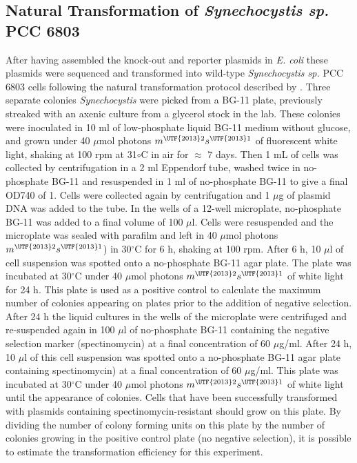 \subsection{Natural Transformation of \textit{Synechocystis sp.} PCC 6803}
\label{sec:transf}
After having assembled the knock-out and reporter plasmids in \textit{E. coli} these plasmids were sequenced and transformed into wild-type \textit{Synechocystis sp.} PCC 6803 cells following the natural transformation protocol described by \cite{Pope2020}.
Three separate colonies \textit{Synechocystis} were picked from a BG-11 plate, previously streaked with an axenic culture from a glycerol stock in the lab. These colonies were inoculated in 10 ml of low-phosphate liquid BG-11 medium without glucose, and grown under 40 $\mu$mol photons $m^{\UTF{2013}2} s^{\UTF{2013}1}$ of fluorescent white light, shaking at 100 rpm at 31$\circ$C in air for $\approx$ 7 days. 
Then 1 mL of cells was collected by centrifugation in a 2 ml Eppendorf tube, washed twice in no-phosphate BG-11 and resuspended in 1 ml of no-phosphate BG-11 to give a final OD740 of 1. Cells were collected again by centrifugation and 1 $\mu$g of plasmid DNA was added to the tube. In the wells of a 12-well microplate, no-phosphate BG-11 was added to a final volume of 100 $\mu$l. Cells were resuspended and the microplate was sealed with parafilm and left in  40 $\mu$mol photons $m^{\UTF{2013}2} s^{\UTF{2013}1}$) in 30$^{\circ}$C for 6 h, shaking at 100 rpm. After 6 h, 10 $\mu$l of cell suspension was spotted onto a no-phosphate BG-11 agar plate. The plate was incubated at 30$^{\circ}$C under 40 $\mu$mol photons $m^{\UTF{2013}2} s^{\UTF{2013}1}$ of white light for 24 h. This plate is used as a positive control to calculate the maximum number of colonies appearing on plates prior to the addition of negative selection.
After 24 h the liquid cultures in the wells of the microplate were centrifuged and re-suspended again in 100 $\mu$l of no-phosphate BG-11 containing the negative selection marker (spectinomycin) at a final concentration of 60 $\mu$g/ml.
After 24 h, 10 $\mu$l of this cell suspension was  spotted onto a no-phosphate BG-11 agar plate containing spectinomycin) at a final concentration of 60 $\mu$g/ml. This plate was incubated at 30$^{\circ}$C under 40 $\mu$mol photons $m^{\UTF{2013}2} s^{\UTF{2013}1}$ of white light until the appearance of colonies. Cells that have been successfully transformed with plasmids containing spectinomycin-resistant should grow on this plate. By dividing the number of colony forming units on this plate by the number of colonies growing in the positive control plate (no negative selection), it is possible to estimate the transformation efficiency for this experiment.

